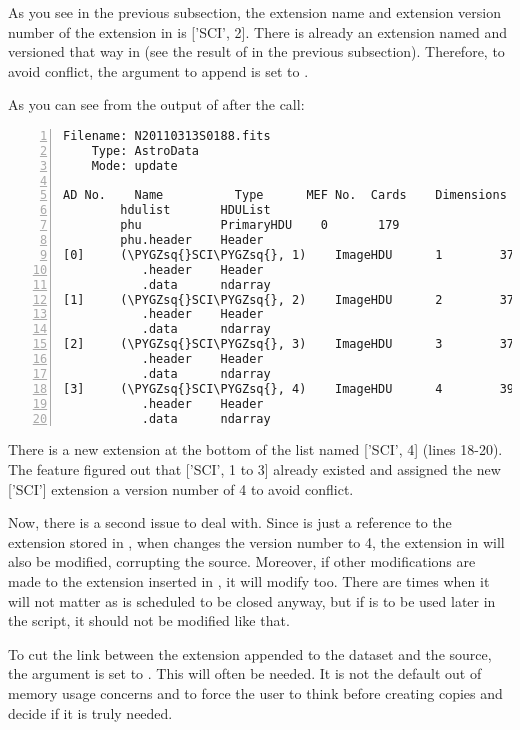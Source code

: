 \documentclass[letterpaper,10pt,english]{sphinxmanual}
\def\PYGZsq{\char`\'}
\begin{document}
As you see in the previous subsection, the extension name and extension
version number of the extension in  is {[}'SCI', 2{]}.  There
is already an extension named and versioned that way in  (see the
result of  in the previous subsection).  Therefore, to avoid
conflict, the argument to append  is set to .

As you can see from the output of  after the  call:

\begin{Verbatim}[commandchars=\\\{\},numbers=left,firstnumber=1,stepnumber=1]
Filename: N20110313S0188.fits
    Type: AstroData
    Mode: update

AD No.    Name          Type      MEF No.  Cards    Dimensions   Format
        hdulist       HDUList
        phu           PrimaryHDU    0       179
        phu.header    Header
[0]     (\PYGZsq{}SCI\PYGZsq{}, 1)    ImageHDU      1        37    (2304, 1056)  float32
           .header    Header
           .data      ndarray
[1]     (\PYGZsq{}SCI\PYGZsq{}, 2)    ImageHDU      2        37    (2304, 1056)  float32
           .header    Header
           .data      ndarray
[2]     (\PYGZsq{}SCI\PYGZsq{}, 3)    ImageHDU      3        37    (2304, 1056)  float32
           .header    Header
           .data      ndarray
[3]     (\PYGZsq{}SCI\PYGZsq{}, 4)    ImageHDU      4        39    (2304, 1056)  float32
           .header    Header
           .data      ndarray
\end{Verbatim}

There is a new extension at the bottom of the list named {[}'SCI', 4{]} (lines
18-20).  The  feature figured out that {[}'SCI', 1 to 3{]} already
existed and assigned the new {[}'SCI'{]} extension a version number of 4 to avoid
conflict.

Now, there is a second issue to deal with.  Since  is just
a reference to the extension stored in , when 
changes the version number to 4, the extension in  will also be
modified, corrupting the source.  Moreover, if other modifications are made
to the extension inserted in , it will modify  too. There are
times when it will not matter as  is scheduled to be closed anyway,
but if  is to be used later in the script, it should not be modified
like that.

To cut the link between the extension appended to the dataset and the
source, the argument  is set to .  This will often be
needed.  It is not the default out of memory usage concerns and to force
the user to think before creating copies and decide if it is truly needed.
\end{document}
